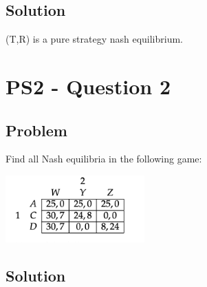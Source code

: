 \documentclass[10pt, a4paper]{article}
\begin{document}
  \subsection*{Solution}
    (T,R) is a pure strategy nash equilibrium. 
\section*{PS2 - Question 2}
  \subsection*{Problem}
    Find all Nash equilibria in the following game: 
    \begin{center}
      \includegraphics[width=0.4\textwidth]{PS2-2.png}
    \end{center}
  \subsection*{Solution}
    
\end{document}
